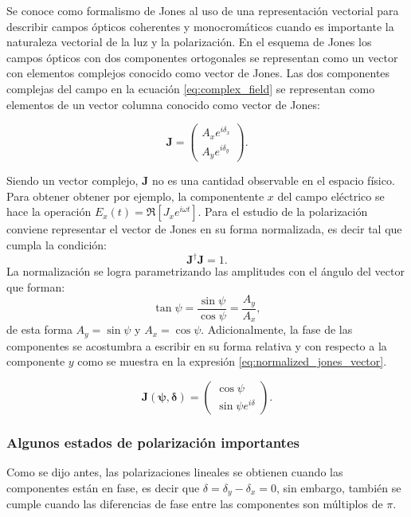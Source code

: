 Se conoce como formalismo de Jones al uso de una representación
vectorial para describir campos ópticos coherentes y monocromáticos cuando es
importante la naturaleza vectorial de la luz y la polarización.  
En el esquema de Jones los campos ópticos con dos componentes ortogonales se
representan como un vector con elementos complejos conocido como
vector de Jones. Las dos componentes complejas del campo en la ecuación
\ref{eq:complex_field} se representan como elementos de un vector
columna conocido como vector de Jones:
 
\begin{equation}
\mathbf{J} =\begin{pmatrix} A_xe^{i\delta_x}\\A_ye^{i\delta_y}\end{pmatrix}.
\label{eq:jones_vector}
\end{equation}

Siendo un vector complejo, $\mathbf{J}$ no es una cantidad observable
en el espacio físico. Para obtener obtener por ejemplo, la
componentente  $x$ del campo eléctrico se hace la operación $E_x(t) = \Re
\left[J_xe^{i\omega t}\right]$.
Para el estudio de la polarización conviene representar el vector de
Jones en su forma normalizada, es decir tal que cumpla la condición: $$\mathbf{J}^{\dagger}\mathbf{J}=1.$$
La normalización se logra parametrizando las amplitudes con el ángulo
del vector que forman: $$\tan{\psi}=\frac{\sin{\psi}}{\cos{\psi}}=\frac{A_y}{A_x},$$
de esta forma $A_y=\sin{\psi}$ y $A_x = \cos{\psi}$. Adicionalmente,
la fase de las componentes se acostumbra a escribir en su forma
relativa y con respecto a la componente $y$ como se muestra en la
expresión \ref{eq:normalized_jones_vector}.

\begin{equation}
\mathbf{J(\psi,\delta)} =\begin{pmatrix} \cos{\psi}\\\sin{\psi}e^{i\delta}\end{pmatrix}.
\label{eq:normalized_jones_vector}
\end{equation}

\subsubsection{Algunos estados de polarización importantes}
Como se dijo antes, las polarizaciones lineales se obtienen cuando las
componentes están en fase, es decir que $\delta =
\delta_y-\delta_x=0$, sin embargo, también se cumple cuando las
diferencias de fase entre las componentes son múltiplos de $\pi$. 

